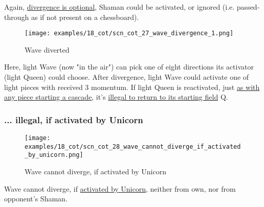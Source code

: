 Again, \hyperref[fig:scn_cot_09_own_shaman_is_divergent_init]{divergence is optional},
Shaman could be activated, or ignored (i.e. passed-through as if not present on a
chessboard).


\clearpage %

\vspace*{-2.1\baselineskip}
\noindent
\begin{figure}[!h]
\texttt{[image: examples/18\_cot/scn\_cot\_27\_wave\_divergence\_1.png]}
\vspace*{-1.3\baselineskip}
\caption{Wave diverted}
\label{fig:scn_cot_27_wave_divergence_1}
\end{figure}

\vspace*{-0.4\baselineskip}
Here, light Wave (now "in the air") can pick one of eight directions its activator
(light Queen) could choose. After divergence, light Wave could activate one of light
pieces with received 3 momentum. If light Queen is reactivated, just
\hyperref[fig:scn_mv_43_static_move_is_illegal_init]{as with any piece starting a cascade}, it's
\hyperref[fig:scn_cot_10_own_shaman_is_divergent_end]{illegal to return to its starting field} Q.

\clearpage %

\subsubsection*{... illegal, if activated by Unicorn}
\label{sec:Conquest of Tlalocan/Divergence/... illegal, if activated by Unicorn}

\vspace*{-1.4\baselineskip}
\noindent
\begin{figure}[!h]
\texttt{[image: examples/18\_cot/scn\_cot\_28\_wave\_cannot\_diverge\_if\_activated\_by\_unicorn.png]}
\vspace*{-1.3\baselineskip}
\caption{Wave cannot diverge, if activated by Unicorn}
\label{fig:scn_cot_28_wave_cannot_diverge_if_activated_by_unicorn}
\end{figure}

\vspace*{-0.5\baselineskip}
Wave cannot diverge, if
\hyperref[fig:scn_mv_22_wave_activation_by_unicorn_first_step]{activated by Unicorn},
neither from own, nor from opponent's Shaman.


